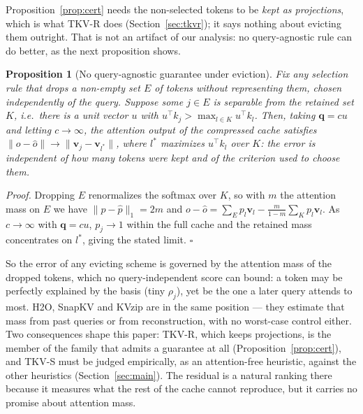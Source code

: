 \documentclass{article}
\newtheorem{proposition}{Proposition}
\begin{document}
Proposition~\ref{prop:cert} needs the non-selected tokens to be \emph{kept as
projections}, which is what TKV-R does (Section~\ref{sec:tkvr}); it says
nothing about evicting them outright. That is not an artifact of our analysis:
no query-agnostic rule can do better, as the next proposition shows.

\begin{proposition}[No query-agnostic guarantee under eviction]
\label{prop:noevict}
Fix any selection rule that drops a non-empty set $E$ of tokens without
representing them, chosen independently of the query. Suppose some
$j \in E$ is separable from the retained set $K$, i.e.\ there is a unit vector
$u$ with $u^\top k_j > \max_{l \in K} u^\top k_l$. Then, taking $\mathbf{q} = cu$
and letting $c \to \infty$, the attention output of the compressed cache
satisfies $\lVert o - \hat o\rVert \to \lVert \mathbf{v}_j - \mathbf{v}_{l^*}\rVert$,
where $l^*$ maximizes $u^\top k_l$ over $K$: the error is independent of how
many tokens were kept and of the criterion used to choose them.
\end{proposition}

\emph{Proof.} Dropping $E$ renormalizes the softmax over $K$, so with $m$ the
attention mass on $E$ we have $\lVert p - \hat p\rVert_1 = 2m$ and
$o - \hat o = \sum_{E} p_l \mathbf{v}_l - \frac{m}{1-m}\sum_{K} p_l \mathbf{v}_l$.
As $c\to\infty$ with $\mathbf{q} = cu$, $p_j \to 1$ within the full cache and the
retained mass concentrates on $l^*$, giving the stated limit. \hfill$\square$

So the error of any evicting scheme is governed by the attention mass of the
dropped tokens, which no query-independent score can bound: a token may be
perfectly explained by the basis (tiny $\rho_j$), yet be the one a later query
attends to most. H2O, SnapKV and KVzip are in the same position --- they
estimate that mass from past queries or from reconstruction, with no worst-case
control either. Two consequences shape this paper: TKV-R, which keeps
projections, is the member of the family that admits a guarantee at all
(Proposition~\ref{prop:cert}), and TKV-S must be judged empirically, as an
attention-free heuristic, against the other heuristics
(Section~\ref{sec:main}). The residual is a natural ranking there because it
measures what the rest of the cache cannot reproduce, but it carries no
promise about attention mass.
\end{document}
